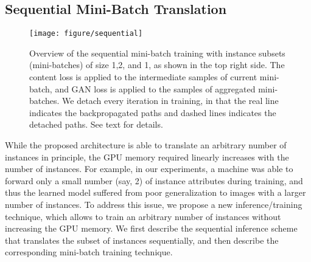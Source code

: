 \documentclass{article} \usepackage{iclr2019_conference,times}
\begin{document}
\vspace{-0.025in}
\subsection{Sequential Mini-Batch Translation}
\label{sec:method-algorithm}
\vspace{-0.025in}

\begin{figure}[t]
\vspace{-0.2in}
\centering
\texttt{[image: figure/sequential]}
\caption{
Overview of the sequential mini-batch training with instance subsets (mini-batches) of size 1,2, and 1, as shown in the top right side.
The content loss is applied to the intermediate samples of current mini-batch,
and GAN loss is applied to the samples of aggregated mini-batches.
We detach every iteration in training, in that
the real line indicates the backpropagated paths and dashed lines indicates the detached paths. See text for details. 
} \label{fig:sequential}
\vspace{-0.1in}
\end{figure}






While the proposed architecture is able to translate an arbitrary number of instances in principle,
the GPU memory required linearly increases with the number of instances. 
For example, in our experiments, a machine was able to forward only a small number (say, 2) of instance attributes  during training,
and thus the learned model suffered from poor generalization to images with a larger number of instances.
To address this issue, we propose a new inference/training technique, which allows to train an arbitrary number of instances without increasing the GPU memory.
We first describe the sequential inference scheme that
translates the subset of instances sequentially, and then describe the corresponding mini-batch training technique.
\end{document}
